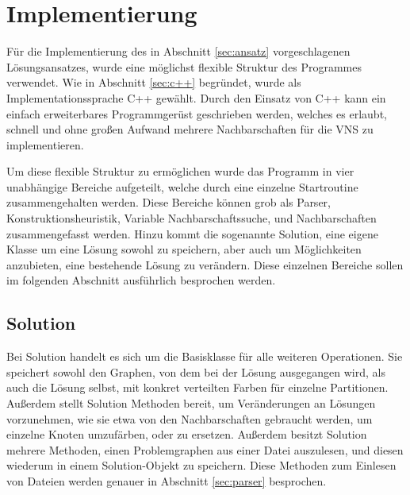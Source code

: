 \section{Implementierung}
Für die Implementierung des in Abschnitt \ref{sec:ansatz} vorgeschlagenen Lösungsansatzes, wurde eine möglichst flexible Struktur des Programmes verwendet. Wie in Abschnitt \ref{sec:c++} begründet, wurde
als Implementationssprache C++ gewählt. Durch den Einsatz von C++ kann ein einfach erweiterbares Programmgerüst geschrieben werden, welches es erlaubt, schnell und ohne großen Aufwand mehrere Nachbarschaften
für die VNS zu implementieren. 

Um diese flexible Struktur zu ermöglichen wurde das Programm in vier unabhängige Bereiche aufgeteilt, welche durch eine einzelne Startroutine zusammengehalten werden. Diese Bereiche können grob als Parser, 
Konstruktionsheuristik, Variable Nachbarschaftssuche, und Nachbarschaften zusammengefasst werden. Hinzu kommt die sogenannte Solution, eine eigene Klasse um eine Lösung sowohl zu speichern, aber auch um Möglichkeiten
anzubieten, eine bestehende Lösung zu verändern. Diese einzelnen Bereiche sollen im folgenden Abschnitt ausführlich besprochen werden.

\subsection{Solution}
Bei Solution handelt es sich um die Basisklasse für alle weiteren Operationen. Sie speichert sowohl den Graphen, von dem bei der Lösung ausgegangen wird, als auch die Lösung selbst, mit konkret verteilten Farben
für einzelne Partitionen. Außerdem stellt Solution Methoden bereit, um Veränderungen an Lösungen vorzunehmen, wie sie etwa von den Nachbarschaften gebraucht werden, um einzelne Knoten umzufärben, oder zu ersetzen.
Außerdem besitzt Solution mehrere Methoden, einen Problemgraphen aus einer Datei auszulesen, und diesen wiederum in einem Solution-Objekt zu speichern. Diese Methoden zum Einlesen von Dateien werden genauer 
in Abschnitt \ref{sec:parser} besprochen.

